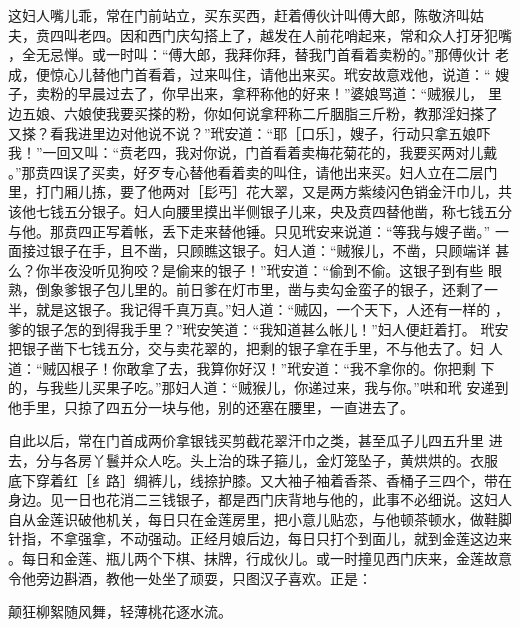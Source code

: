 这妇人嘴儿乖，常在门前站立，买东买西，赶着傅伙计叫傅大郎，陈敬济叫姑
夫，贲四叫老四。因和西门庆勾搭上了，越发在人前花哨起来，常和众人打牙犯嘴
，全无忌惮。或一时叫：“傅大郎，我拜你拜，替我门首看着卖粉的。”那傅伙计
老成，便惊心儿替他门首看着，过来叫住，请他出来买。玳安故意戏他，说道：“
嫂子，卖粉的早晨过去了，你早出来，拿秤称他的好来！”婆娘骂道：“贼猴儿，
里边五娘、六娘使我要买搽的粉，你如何说拿秤称二斤胭脂三斤粉，教那淫妇搽了
又搽？看我进里边对他说不说？”玳安道：“耶［口乐］，嫂子，行动只拿五娘吓
我！”一回又叫：“贲老四，我对你说，门首看着卖梅花菊花的，我要买两对儿戴
。”那贲四误了买卖，好歹专心替他看着卖的叫住，请他出来买。妇人立在二层门
里，打门厢儿拣，要了他两对［髟丐］花大翠，又是两方紫绫闪色销金汗巾儿，共
该他七钱五分银子。妇人向腰里摸出半侧银子儿来，央及贲四替他凿，称七钱五分
与他。那贲四正写着帐，丢下走来替他锤。只见玳安来说道：“等我与嫂子凿。”
一面接过银子在手，且不凿，只顾瞧这银子。妇人道：“贼猴儿，不凿，只顾端详
甚么？你半夜没听见狗咬？是偷来的银子！”玳安道：“偷到不偷。这银子到有些
眼熟，倒象爹银子包儿里的。前日爹在灯市里，凿与卖勾金蛮子的银子，还剩了一
半，就是这银子。我记得千真万真。”妇人道：“贼囚，一个天下，人还有一样的
，爹的银子怎的到得我手里？”玳安笑道：“我知道甚么帐儿！”妇人便赶着打。
玳安把银子凿下七钱五分，交与卖花翠的，把剩的银子拿在手里，不与他去了。妇
人道：“贼囚根子！你敢拿了去，我算你好汉！”玳安道：“我不拿你的。你把剩
下的，与我些儿买果子吃。”那妇人道：“贼猴儿，你递过来，我与你。”哄和玳
安递到他手里，只掠了四五分一块与他，别的还塞在腰里，一直进去了。

自此以后，常在门首成两价拿银钱买剪截花翠汗巾之类，甚至瓜子儿四五升里
进去，分与各房丫鬟并众人吃。头上治的珠子箍儿，金灯笼坠子，黄烘烘的。衣服
底下穿着红［纟路］绸裤儿，线捺护膝。又大袖子袖着香茶、香桶子三四个，带在
身边。见一日也花消二三钱银子，都是西门庆背地与他的，此事不必细说。这妇人
自从金莲识破他机关，每日只在金莲房里，把小意儿贴恋，与他顿茶顿水，做鞋脚
针指，不拿强拿，不动强动。正经月娘后边，每日只打个到面儿，就到金莲这边来
。每日和金莲、瓶儿两个下棋、抹牌，行成伙儿。或一时撞见西门庆来，金莲故意
令他旁边斟酒，教他一处坐了顽耍，只图汉子喜欢。正是：

颠狂柳絮随风舞，轻薄桃花逐水流。